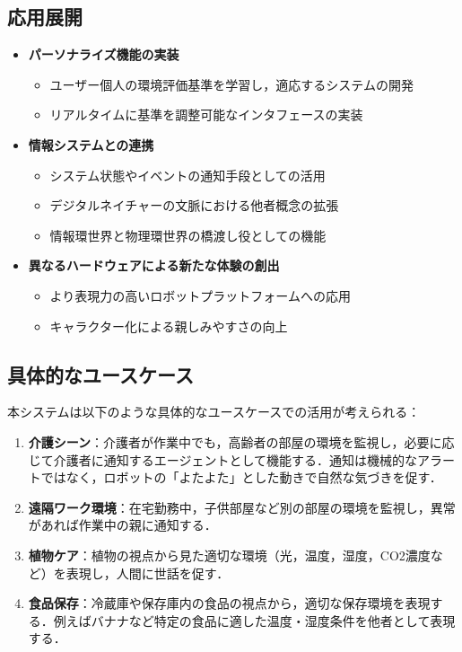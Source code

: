 \documentclass{cuxarticle}
\begin{document}
\subsection{応用展開}
\begin{itemize}
  \item \textbf{パーソナライズ機能の実装}
    \begin{itemize}
      \item ユーザー個人の環境評価基準を学習し，適応するシステムの開発
      \item リアルタイムに基準を調整可能なインタフェースの実装
    \end{itemize}

  \item \textbf{情報システムとの連携}
    \begin{itemize}
      \item システム状態やイベントの通知手段としての活用
      \item デジタルネイチャーの文脈における他者概念の拡張
      \item 情報環世界と物理環世界の橋渡し役としての機能
    \end{itemize}

  \item \textbf{異なるハードウェアによる新たな体験の創出}
    \begin{itemize}
      \item より表現力の高いロボットプラットフォームへの応用
      \item キャラクター化による親しみやすさの向上
    \end{itemize}
\end{itemize}

\subsection{具体的なユースケース}
本システムは以下のような具体的なユースケースでの活用が考えられる：

\begin{enumerate}
  \item \textbf{介護シーン}：介護者が作業中でも，高齢者の部屋の環境を監視し，必要に応じて介護者に通知するエージェントとして機能する．通知は機械的なアラートではなく，ロボットの「よたよた」とした動きで自然な気づきを促す．

  \item \textbf{遠隔ワーク環境}：在宅勤務中，子供部屋など別の部屋の環境を監視し，異常があれば作業中の親に通知する．

  \item \textbf{植物ケア}：植物の視点から見た適切な環境（光，温度，湿度，CO2濃度など）を表現し，人間に世話を促す．

  \item \textbf{食品保存}：冷蔵庫や保存庫内の食品の視点から，適切な保存環境を表現する．例えばバナナなど特定の食品に適した温度・湿度条件を他者として表現する．
\end{enumerate}
\end{document}
